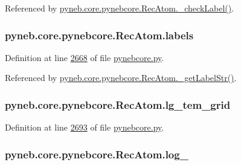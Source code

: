 Referenced by \hyperlink{pynebcore_8py_source_l02839}{pyneb.\+core.\+pynebcore.\+Rec\+Atom.\+\_\+check\+Label()}.

\hypertarget{classpyneb_1_1core_1_1pynebcore_1_1_rec_atom_a0a758f4eb5a1b0780542eda87dcaeed3}{}
\subsubsection[{labels}]{\setlength{\rightskip}{0pt plus 5cm}pyneb.\+core.\+pynebcore.\+Rec\+Atom.\+labels}\label{classpyneb_1_1core_1_1pynebcore_1_1_rec_atom_a0a758f4eb5a1b0780542eda87dcaeed3}


Definition at line \hyperlink{pynebcore_8py_source_l02668}{2668} of file \hyperlink{pynebcore_8py_source}{pynebcore.\+py}.



Referenced by \hyperlink{pynebcore_8py_source_l02854}{pyneb.\+core.\+pynebcore.\+Rec\+Atom.\+\_\+get\+Label\+Str()}.

\hypertarget{classpyneb_1_1core_1_1pynebcore_1_1_rec_atom_a6c6ed37093cbb2b2cf5a48df56357879}{}
\subsubsection[{lg\+\_\+tem\+\_\+grid}]{\setlength{\rightskip}{0pt plus 5cm}pyneb.\+core.\+pynebcore.\+Rec\+Atom.\+lg\+\_\+tem\+\_\+grid}\label{classpyneb_1_1core_1_1pynebcore_1_1_rec_atom_a6c6ed37093cbb2b2cf5a48df56357879}


Definition at line \hyperlink{pynebcore_8py_source_l02693}{2693} of file \hyperlink{pynebcore_8py_source}{pynebcore.\+py}.

\hypertarget{classpyneb_1_1core_1_1pynebcore_1_1_rec_atom_ad901cd583cbb6a4008bc41013e16d82f}{}
\subsubsection[{log\+\_\+}]{\setlength{\rightskip}{0pt plus 5cm}pyneb.\+core.\+pynebcore.\+Rec\+Atom.\+log\+\_\+}\label{classpyneb_1_1core_1_1pynebcore_1_1_rec_atom_ad901cd583cbb6a4008bc41013e16d82f}


